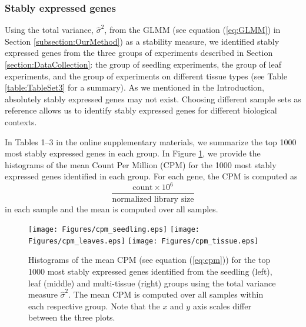 \subsubsection{Stably expressed genes}\label{section:stablyExpressedGene}
Using the total variance, $\hat\sigma^2$, from the GLMM (see
equation (\ref{eq:GLMM}) in Section \ref{subsection:OurMethod}) as a
stability measure, we identified stably expressed genes from the three groups
of experiments described in Section \ref{section:DataCollection}: the group of
seedling experiments, the group of leaf experiments, and the group of
experiments on different tissue types (see Table \ref{table:TableSet3} for a
summary).
As we mentioned in the Introduction, absolutely stably expressed genes may not
exist.  Choosing different sample sets as reference allows us to identify
stably expressed genes for different biological contexts.

In Tables 1--3 in the online supplementary materials, we summarize the
top 1000 most stably expressed genes in each group.  In Figure \ref{cpm}, we
provide the histograms of the mean Count Per Million (CPM) for the 1000
most stably expressed genes identified in each group. For each gene, the CPM
is computed as
\begin{equation}\label{eq:cpm}
\dfrac{ \text{count} \times 10^6 }{ \text{normalized library size}} 
\end{equation}
in each sample and the mean is computed over all samples.

\begin{figure}[tbp] \begin{center}
		\texttt{[image: Figures/cpm\_seedling.eps]}
		\texttt{[image: Figures/cpm\_leaves.eps]}
		\texttt{[image: Figures/cpm\_tissue.eps]}
		\caption[Histograms of the mean RNA-Seq CPM]{{\small{\label{cpm} 
					Histograms of the mean CPM (see equation (\ref{eq:cpm})) for the top 1000
					most stably expressed genes identified from the seedling (left), leaf (middle) 
					and multi-tissue
					(right) groups
					using  the total variance measure $\hat{\sigma}^2$}}. 
			The mean CPM is computed over all samples within each respective group. Note that the 
			$x$ and $y$ axis scales differ between the three plots.
		} \end{center} 
	\end{figure} 
	
